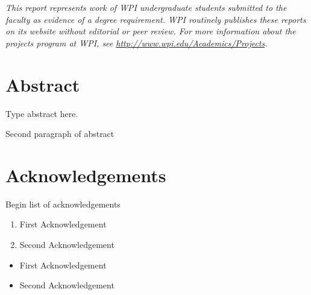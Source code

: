 \documentclass{article}
\begin{document}
\begin{center}
\begin{figure}[h]
    \end{figure}
    \large{\textit{This report represents work of WPI undergraduate students submitted to the faculty as evidence of a degree requirement. WPI routinely publishes these reports on its website without editorial or peer review. For more information about the projects program at WPI, see \url{http://www.wpi.edu/Academics/Projects}.}} %
\end{center}


\newpage %
\setcounter{page}{1} %

\section*{Abstract} %

\noindent Type abstract here. %
\par Second paragraph of abstract %

\newpage %
\section*{Acknowledgements} %

\noindent Begin list of acknowledgements
\begin{enumerate} %
    \item First Acknowledgement %
    \item Second Acknowledgement %
\end{enumerate}


\begin{itemize} %
    \item First Acknowledgement %
    \item Second Acknowledgement %
\end{itemize}
\end{document}
